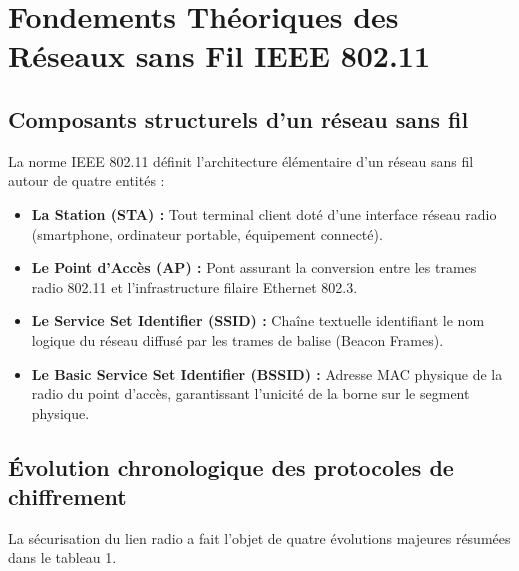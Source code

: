 \documentclass[a4paper,11pt]{article}
\begin{document}
\section{Fondements Théoriques des Réseaux sans Fil IEEE 802.11}

\subsection{Composants structurels d'un réseau sans fil}
La norme IEEE 802.11 définit l'architecture élémentaire d'un réseau sans fil autour de quatre entités :
\begin{itemize}
  \item \textbf{La Station (STA) :} Tout terminal client doté d'une interface réseau radio (smartphone, ordinateur portable, équipement connecté).
  \item \textbf{Le Point d'Accès (AP) :} Pont assurant la conversion entre les trames radio 802.11 et l'infrastructure filaire Ethernet 802.3.
  \item \textbf{Le Service Set Identifier (SSID) :} Chaîne textuelle identifiant le nom logique du réseau diffusé par les trames de balise (Beacon Frames).
  \item \textbf{Le Basic Service Set Identifier (BSSID) :} Adresse MAC physique de la radio du point d'accès, garantissant l'unicité de la borne sur le segment physique.
\end{itemize}

\subsection{Évolution chronologique des protocoles de chiffrement}
La sécurisation du lien radio a fait l'objet de quatre évolutions majeures résumées dans le tableau 1.
\end{document}
